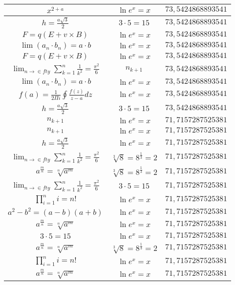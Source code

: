 \documentclass{article}
\begin{document}
\begin{flushleft}
\begin{longtable}{|c|c|c|}
$x^{2+a}$ & $\ln e^x=x$ & $73,5424868893541$ \\ \hline 
$h=\frac{a\sqrt{3}}{2}$ & $3\cdot 5=15$ & $73,5424868893541$ \\ \hline 
$F=q\left(E+v\times B\right)$ & $\ln e^x=x$ & $73,5424868893541$ \\ \hline 
$\lim\left(a_n\cdot b_n\right)=a\cdot b$ & $\ln e^x=x$ & $73,5424868893541$ \\ \hline 
$F=q\left(E+v\times B\right)$ & $\ln e^x=x$ & $73,5424868893541$ \\ \hline 
$\lim_{n\to\in fty}\sum_{k=1}^n\frac{1}{k^2}=\frac{\pi^2}{6}$ & $n_{k+1}$ & $73,5424868893541$ \\ \hline 
$\lim\left(a_n\cdot b_n\right)=a\cdot b$ & $\ln e^x=x$ & $73,5424868893541$ \\ \hline 
$f\left(a\right)=\frac{1}{2\Pi i}\oint\frac{f\left(z\right)}{z-a}dz$ & $\ln e^x=x$ & $73,5424868893541$ \\ \hline 
$h=\frac{a\sqrt{3}}{2}$ & $3\cdot 5=15$ & $73,5424868893541$ \\ \hline 
$n_{k+1}$ & $\ln e^x=x$ & $71,7157287525381$ \\ \hline 
$n_{k+1}$ & $\ln e^x=x$ & $71,7157287525381$ \\ \hline 
$h=\frac{a\sqrt{3}}{2}$ & $\ln e^x=x$ & $71,7157287525381$ \\ \hline 
$\lim_{n\to\in fty}\sum_{k=1}^n\frac{1}{k^2}=\frac{\pi^2}{6}$ & $\sqrt[3]{8}=8^{\frac{1}{3}}=2$ & $71,7157287525381$ \\ \hline 
$a^{\frac{m}{n}}=\sqrt[n]{a^{m}}$ & $\sqrt[3]{8}=8^{\frac{1}{3}}=2$ & $71,7157287525381$ \\ \hline 
$\lim_{n\to\in fty}\sum_{k=1}^n\frac{1}{k^2}=\frac{\pi^2}{6}$ & $3\cdot 5=15$ & $71,7157287525381$ \\ \hline 
$\prod_{i=1}^ni=n!$ & $\ln e^x=x$ & $71,7157287525381$ \\ \hline 
$a^2-b^2=(a-b)(a+b)$ & $\ln e^x=x$ & $71,7157287525381$ \\ \hline 
$a^{\frac{m}{n}}=\sqrt[n]{a^{m}}$ & $\ln e^x=x$ & $71,7157287525381$ \\ \hline 
$3\cdot 5=15$ & $\ln e^x=x$ & $71,7157287525381$ \\ \hline 
$a^{\frac{m}{n}}=\sqrt[n]{a^{m}}$ & $\sqrt[3]{8}=8^{\frac{1}{3}}=2$ & $71,7157287525381$ \\ \hline 
$\prod_{i=1}^ni=n!$ & $\ln e^x=x$ & $71,7157287525381$ \\ \hline 
$a^{\frac{m}{n}}=\sqrt[n]{a^{m}}$ & $\ln e^x=x$ & $71,7157287525381$ \\ \hline 

\end{longtable}
\end{flushleft}
\end{document}
